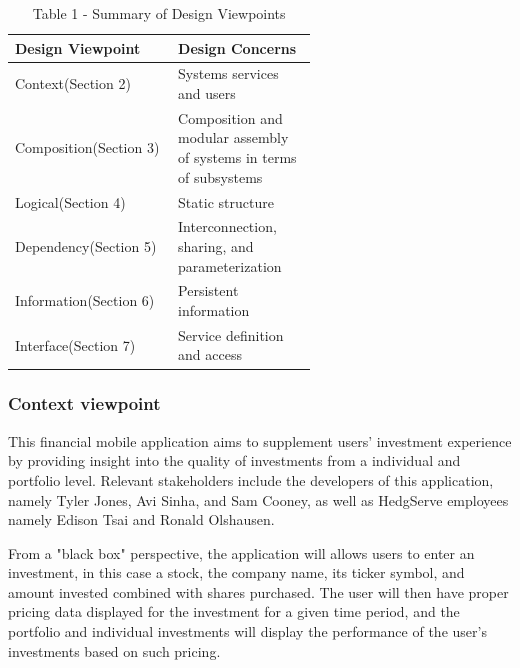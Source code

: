 \documentclass[onecolumn, draftclsnofoot,10pt, compsoc]{IEEEtran}
\begin{document}
\begin{table}[h]
                        \caption{Table 1 - Summary of Design Viewpoints}
                        \centering
                                \begin{tabular}{| p{0.3\linewidth} | p{0.3\linewidth} | }
                                        \hline
                                         \textbf{Design Viewpoint} & \textbf{Design Concerns}\\ [0.5ex]
                                        \hline
                                        Context(Section 2)  & Systems services and users\\
                                        \hline
                                         Composition(Section 3) & Composition and modular assembly of systems in terms of subsystems\\
                                        \hline
                                         Logical(Section 4) & Static structure\\
                                        \hline
                                        Dependency(Section 5) & Interconnection, sharing, and parameterization\\
                                        \hline
                                        Information(Section 6) & Persistent information\\
                                        \hline
                                        Interface(Section 7) & Service definition and access\\
                                        \hline
                                \end{tabular}
\end{table}     


\subsubsection{Context viewpoint}
        This financial mobile application aims to supplement users' investment experience by providing insight into the quality of investments from a individual and portfolio level.
        Relevant stakeholders include the developers of this application, namely Tyler Jones, Avi Sinha, and Sam Cooney, as well as HedgServe employees namely Edison Tsai and Ronald Olshausen.

        From a "black box" perspective, the application will allows users to enter an investment, in this case a stock, the company name, its ticker symbol,
        and amount invested combined with shares purchased. The user will then have proper pricing data displayed for the investment for a given time period, and the portfolio and individual
        investments will display the performance of the user's investments based on such pricing.
\end{document}
